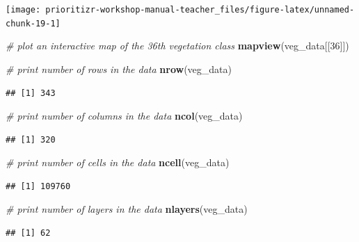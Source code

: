 \documentclass[12pt,]{book}
\newenvironment{Shaded}{\begin{snugshade}}{\end{snugshade}}
\newcommand{\KeywordTok}[1]{\textcolor[rgb]{0.13,0.29,0.53}{\textbf{#1}}}
\newcommand{\DecValTok}[1]{\textcolor[rgb]{0.00,0.00,0.81}{#1}}
\newcommand{\CommentTok}[1]{\textcolor[rgb]{0.56,0.35,0.01}{\textit{#1}}}
\newcommand{\NormalTok}[1]{#1}
\begin{document}
\begin{center}\texttt{[image: prioritizr-workshop-manual-teacher\_files/figure-latex/unnamed-chunk-19-1]} \end{center}

\begin{Shaded}
\begin{Highlighting}[]
\CommentTok{# plot an interactive map of the 36th vegetation class}
\KeywordTok{mapview}\NormalTok{(veg_data[[}\DecValTok{36}\NormalTok{]])}
\end{Highlighting}
\end{Shaded}

\begin{Shaded}
\begin{Highlighting}[]
\CommentTok{# print number of rows in the data}
\KeywordTok{nrow}\NormalTok{(veg_data)}
\end{Highlighting}
\end{Shaded}

\begin{verbatim}
## [1] 343
\end{verbatim}

\begin{Shaded}
\begin{Highlighting}[]
\CommentTok{# print number of columns  in the data}
\KeywordTok{ncol}\NormalTok{(veg_data)}
\end{Highlighting}
\end{Shaded}

\begin{verbatim}
## [1] 320
\end{verbatim}

\begin{Shaded}
\begin{Highlighting}[]
\CommentTok{# print number of cells in the data}
\KeywordTok{ncell}\NormalTok{(veg_data)}
\end{Highlighting}
\end{Shaded}

\begin{verbatim}
## [1] 109760
\end{verbatim}

\begin{Shaded}
\begin{Highlighting}[]
\CommentTok{# print number of layers in the data}
\KeywordTok{nlayers}\NormalTok{(veg_data)}
\end{Highlighting}
\end{Shaded}

\begin{verbatim}
## [1] 62
\end{verbatim}
\end{document}
